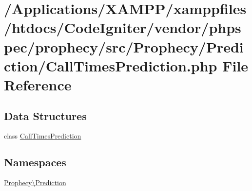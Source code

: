 \hypertarget{_call_times_prediction_8php}{}\section{/\+Applications/\+X\+A\+M\+P\+P/xamppfiles/htdocs/\+Code\+Igniter/vendor/phpspec/prophecy/src/\+Prophecy/\+Prediction/\+Call\+Times\+Prediction.php File Reference}
\label{_call_times_prediction_8php}
\subsection*{Data Structures}
\begin{DoxyCompactItemize}
\item 
class \mbox{\hyperlink{class_prophecy_1_1_prediction_1_1_call_times_prediction}{Call\+Times\+Prediction}}
\end{DoxyCompactItemize}
\subsection*{Namespaces}
\begin{DoxyCompactItemize}
\item 
 \mbox{\hyperlink{namespace_prophecy_1_1_prediction}{Prophecy\textbackslash{}\+Prediction}}
\end{DoxyCompactItemize}
